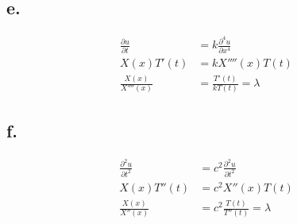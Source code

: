 \documentclass[11pt]{article}
\theoremstyle{mystyle}
\theoremstyle{definition}
\begin{document}
\subsection*{e.}
\begin{align*}
  \displaystyle\frac{\partial u}{\partial t} &= k \displaystyle\frac{\partial^4 u}{\partial x^4}\\
  X(x)T'(t) &= k X''''(x)T(t) \\
  \displaystyle\frac{X(x)}{X''''(x)} &= \displaystyle\frac{T'(t)}{kT(t)} = \lambda
\end{align*}
\subsection*{f.}
\begin{align*}
  \displaystyle\frac{\partial^2 u}{\partial t^2} &= c^2 \displaystyle\frac{\partial^2 u}{\partial t^2} \\
  X(x)T''(t) &= c^2X''(x)T(t) \\
  \displaystyle\frac{X(x)}{X''(x)} &= c^2 \displaystyle\frac{T(t)}{T''(t)} = \lambda
\end{align*}
\newpage
\end{document}

